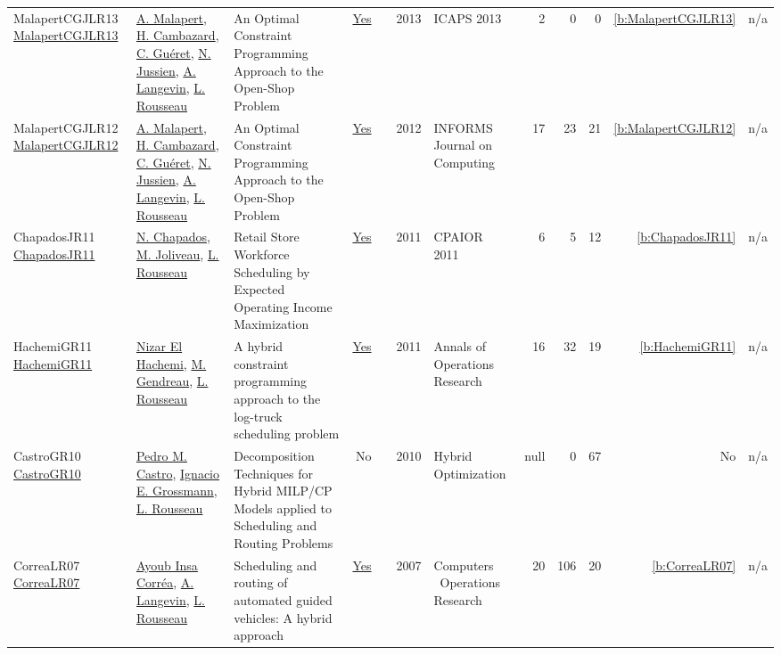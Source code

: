 {\begin{longtable}{>{\raggedright\arraybackslash}p{3cm}>{\raggedright\arraybackslash}p{6cm}>{\raggedright\arraybackslash}p{6.5cm}rrrp{2.5cm}rrrrr}
MalapertCGJLR13 \href{http://www.aaai.org/ocs/index.php/ICAPS/ICAPS13/paper/view/6016}{MalapertCGJLR13} & \hyperref[auth:a82]{A. Malapert}, \hyperref[auth:a1011]{H. Cambazard}, \hyperref[auth:a295]{C. Gu{\'{e}}ret}, \hyperref[auth:a249]{N. Jussien}, \hyperref[auth:a651]{A. Langevin}, \hyperref[auth:a329]{L. Rousseau} & An Optimal Constraint Programming Approach to the Open-Shop Problem & \href{../works/MalapertCGJLR13.pdf}{Yes} & \cite{MalapertCGJLR13} & 2013 & ICAPS 2013 & 2 & 0 & 0 & \ref{b:MalapertCGJLR13} & n/a\\
MalapertCGJLR12 \href{https://doi.org/10.1287/ijoc.1100.0446}{MalapertCGJLR12} & \hyperref[auth:a82]{A. Malapert}, \hyperref[auth:a1011]{H. Cambazard}, \hyperref[auth:a295]{C. Gu{\'{e}}ret}, \hyperref[auth:a249]{N. Jussien}, \hyperref[auth:a651]{A. Langevin}, \hyperref[auth:a329]{L. Rousseau} & An Optimal Constraint Programming Approach to the Open-Shop Problem & \href{../works/MalapertCGJLR12.pdf}{Yes} & \cite{MalapertCGJLR12} & 2012 & INFORMS Journal on Computing & 17 & 23 & 21 & \ref{b:MalapertCGJLR12} & n/a\\
ChapadosJR11 \href{https://doi.org/10.1007/978-3-642-21311-3_7}{ChapadosJR11} & \hyperref[auth:a347]{N. Chapados}, \hyperref[auth:a348]{M. Joliveau}, \hyperref[auth:a329]{L. Rousseau} & Retail Store Workforce Scheduling by Expected Operating Income Maximization & \href{../works/ChapadosJR11.pdf}{Yes} & \cite{ChapadosJR11} & 2011 & CPAIOR 2011 & 6 & 5 & 12 & \ref{b:ChapadosJR11} & n/a\\
HachemiGR11 \href{https://doi.org/10.1007/s10479-010-0698-x}{HachemiGR11} & \hyperref[auth:a621]{Nizar El Hachemi}, \hyperref[auth:a622]{M. Gendreau}, \hyperref[auth:a329]{L. Rousseau} & A hybrid constraint programming approach to the log-truck scheduling problem & \href{../works/HachemiGR11.pdf}{Yes} & \cite{HachemiGR11} & 2011 & Annals of Operations Research & 16 & 32 & 19 & \ref{b:HachemiGR11} & n/a\\
CastroGR10 \href{http://dx.doi.org/10.1007/978-1-4419-1644-0_4}{CastroGR10} & \hyperref[auth:a898]{Pedro M. Castro}, \hyperref[auth:a385]{Ignacio E. Grossmann}, \hyperref[auth:a329]{L. Rousseau} & Decomposition Techniques for Hybrid MILP/CP Models applied to Scheduling and Routing Problems & No & \cite{CastroGR10} & 2010 & Hybrid Optimization & null & 0 & 67 & No & n/a\\
CorreaLR07 \href{http://dx.doi.org/10.1016/j.cor.2005.07.004}{CorreaLR07} & \hyperref[auth:a959]{Ayoub Insa Corr{\'{e}}a}, \hyperref[auth:a651]{A. Langevin}, \hyperref[auth:a329]{L. Rousseau} & Scheduling and routing of automated guided vehicles: A hybrid approach & \href{../works/CorreaLR07.pdf}{Yes} & \cite{CorreaLR07} & 2007 & Computers \  Operations Research & 20 & 106 & 20 & \ref{b:CorreaLR07} & n/a\\
\end{longtable}
}

